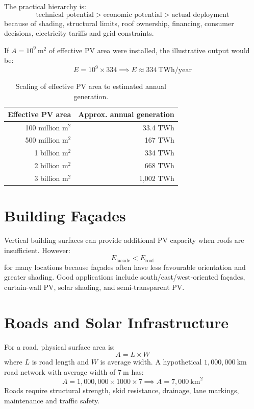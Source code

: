 \documentclass[11pt,a4paper]{article}
\begin{document}
The practical hierarchy is:
\[
\text{technical potential} > \text{economic potential} > \text{actual deployment}
\]
because of shading, structural limits, roof ownership, financing, consumer decisions, electricity tariffs and grid constraints.

If $A = 10^9\ \text{m}^2$ of effective PV area were installed, the illustrative output would be:
\[
E = 10^9 \times 334 \implies \boxed{E \approx 334\ \text{TWh/year}}
\]

\begin{table}[h!]
\centering
\begin{tabular}{rr}
\toprule
\textbf{Effective PV area} & \textbf{Approx. annual generation} \\
\midrule
100 million $\text{m}^2$ & 33.4 TWh \\
500 million $\text{m}^2$ & 167 TWh \\
1 billion $\text{m}^2$   & 334 TWh \\
2 billion $\text{m}^2$   & 668 TWh \\
3 billion $\text{m}^2$   & 1,002 TWh \\
\bottomrule
\end{tabular}
\caption{Scaling of effective PV area to estimated annual generation.}
\end{table}

\section{Building Façades}

Vertical building surfaces can provide additional PV capacity when roofs are insufficient. However:
\[
E_{\text{facade}} < E_{\text{roof}}
\]
for many locations because façades often have less favourable orientation and greater shading. Good applications include south/east/west-oriented façades, curtain-wall PV, solar shading, and semi-transparent PV.

\section{Roads and Solar Infrastructure}

For a road, physical surface area is:
\[
A = L \times W
\]
where $L$ is road length and $W$ is average width. A hypothetical $1,000,000\ \text{km}$ road network with average width of $7\ \text{m}$ has:
\[
A = 1,000,000 \times 1000 \times 7 \implies \boxed{A = 7,000\ \text{km}^2}
\]
Roads require structural strength, skid resistance, drainage, lane markings, maintenance and traffic safety.
\end{document}
